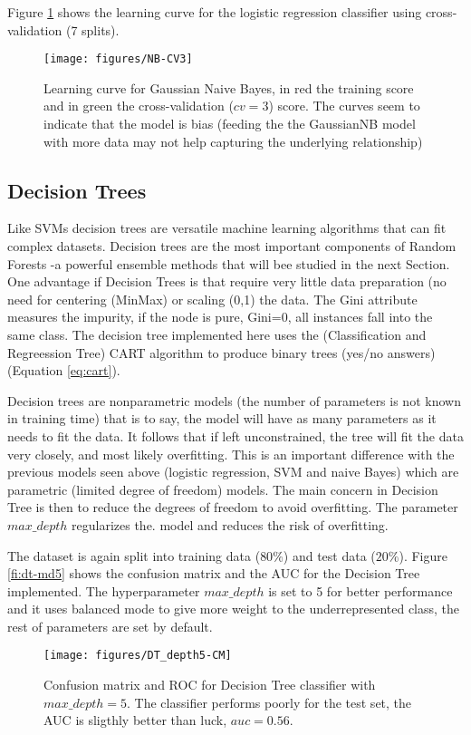 \documentclass[11pt]{article}
\begin{document}
Figure \ref{fig:nb-cv3} shows the learning curve for the logistic regression classifier using cross-validation (7 splits).
\begin{figure}[H]
        \centering
        \texttt{[image: figures/NB-CV3]}
        \caption{Learning curve for Gaussian Naive Bayes, in red the training score and in green the cross-validation ($cv=3$) score. The curves seem to indicate that the model is bias (feeding the the GaussianNB model with more data may not help capturing the underlying relationship)
        }
\label{fig:nb-cv3}
\end{figure}

\subsection{Decision Trees}
\label{se:resdectree}
Like SVMs decision trees are versatile machine learning algorithms that can fit complex datasets. Decision trees are the most important components of Random Forests -a powerful ensemble methods that will bee studied in the next Section.
One advantage if Decision Trees is that require very little data preparation (no need for centering (MinMax) or scaling (0,1) the data.
The Gini attribute measures the impurity, if the node is pure, Gini=0, all instances fall into the same class.
The decision tree implemented here uses the (Classification and Regreession Tree) CART algorithm to produce binary trees (yes/no answers) (Equation \ref{eq:cart}).
 
Decision trees are nonparametric models (the number of parameters is not known in training time) that is to say, the model will have as many parameters as it needs to fit the data. It follows that if left unconstrained, the tree will fit the data very closely, and most likely overfitting. This is an important difference with the previous models seen above (logistic regression, SVM and naive Bayes) which are parametric (limited degree of freedom) models. 
The main concern in Decision Tree is then to reduce the degrees of freedom to avoid overfitting. The parameter $max\_depth$ regularizes the. model and reduces the risk of overfitting.

The dataset is again split into training data ($80\%$) and test data ($20\%$). Figure \ref{fi:dt-md5} shows the confusion matrix and the AUC for the Decision Tree implemented. The hyperparameter $max\_depth$ is set to 5 for better performance and it uses balanced mode to give more weight to the underrepresented class, the rest of parameters are set by default.
\begin{figure}[H]
        \centering
        \texttt{[image: figures/DT\_depth5-CM]}
        \caption{Confusion matrix and ROC for Decision Tree classifier with $max\_depth=5$. The classifier performs poorly for the test set, the AUC is sligthly better than luck, $auc=0.56$.
        }
\label{fig:dt-md5}
\end{figure}
\end{document}
